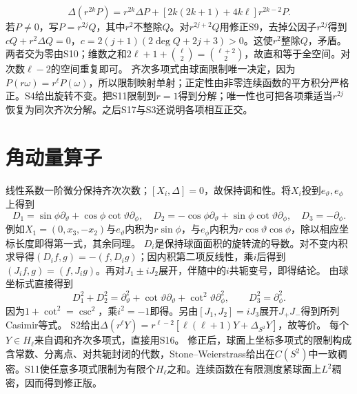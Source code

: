 \documentclass[UTF8,fontset=fandol,11pt]{ctexart}
\begin{document}
\[\Delta(r^{2k}P)=r^{2k}\Delta P+[2k(2k+1)+4k\ell]r^{2k-2}P.\]
若$P\ne0$，写$P=r^{2j}Q$，其中$r^2$不整除$Q$。对$r^{2j+2}Q$用修正S9，去掉公因子$r^{2j}$得到$cQ+r^2\Delta Q=0$，$c=2(j+1)(2\deg Q+2j+3)>0$。这使$r^2$整除$Q$，矛盾。
两者交为零由S10；维数之和$2\ell+1+\binom\ell2=\binom{\ell+2}2$，故直和等于全空间。对次数$\ell-2$的空间重复即可。
齐次多项式由球面限制唯一决定，因为$P(r\omega)=r^\ell P(\omega)$，所以限制映射单射；正定性由非零连续函数的平方积分严格正。S4给出旋转不变。把S11限制到$r=1$得到分解；唯一性也可把各项乘适当$r^{2j}$恢复为同次齐次分解。之后S17与S3还说明各项相互正交。
\section{角动量算子}
线性系数一阶微分保持齐次次数；$[X_i,\Delta]=0$，故保持调和性。将$X_i$投到$e_\vartheta,e_\phi$上得到
\[D_1=\sin\phi\partial_\vartheta+\cos\phi\cot\vartheta\partial_\phi,\quad D_2=-\cos\phi\partial_\vartheta+\sin\phi\cot\vartheta\partial_\phi,\quad D_3=-\partial_\phi.\]
例如$X_1=(0,x_3,-x_2)$与$e_\vartheta$内积为$r\sin\phi$，与$e_\phi$内积为$r\cos\vartheta\cos\phi$，除以相应坐标长度即得第一式，其余同理。
$D_i$是保持球面面积的旋转流的导数。对不变内积求导得$(D_if,g)=-(f,D_ig)$；因内积第二项反线性，乘$i$后得到$(J_if,g)=(f,J_ig)$。再对$J_1\pm iJ_2$展开，伴随中的$i$共轭变号，即得结论。
由球坐标式直接得到
\[D_1^2+D_2^2=\partial_\vartheta^2+\cot\vartheta\partial_\vartheta+\cot^2\vartheta\partial_\phi^2,\qquad D_3^2=\partial_\phi^2.\]
因为$1+\cot^2=\csc^2$，乘$i^2=-1$即得。另由$[J_1,J_2]=iJ_3$展开$J_+J_-$得到所列Casimir等式。
S2给出$\Delta(r^\ell Y)=r^{\ell-2}[\ell(\ell+1)Y+\Delta_{S^2}Y]$，故等价。
每个$Y\in H_\ell$来自调和齐次多项式，直接用S16。
修正后，球面上坐标多项式的限制构成含常数、分离点、对共轭封闭的代数，Stone--Weierstrass给出在$C(S^2)$中一致稠密。S11使任意多项式限制为有限个$H_\ell$之和。连续函数在有限测度紧球面上$L^2$稠密，因而得到修正版。
\end{document}
